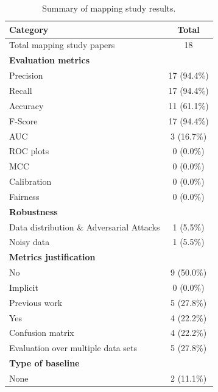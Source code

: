 \documentclass[a4paper]{article}
\begin{document}
\begin{table}[H]
	\caption{Summary of mapping study results.}
	\begin{tabularx}{\textwidth}{|X|c|}
		\hline
		\textbf{Category} & \textbf{Total} \\
		\hline
		Total mapping study papers & 18 \\
		\hline
		\textbf{Evaluation metrics} & \\
		\hspace{3mm} Precision & 17 (94.4\%)  \\
		\hspace{3mm} Recall & 17 (94.4\%) \\
		\hspace{3mm} Accuracy & 11 (61.1\%) \\
		\hspace{3mm} F-Score & 17 (94.4\%)\\
		\hspace{3mm} AUC & 3 (16.7\%) \\
		\hspace{3mm} ROC plots & 0 (0.0\%) \\
		\hspace{3mm} MCC & 0 (0.0\%) \\
		Calibration & 0 (0.0\%) \\
		Fairness &  0 (0.0\%) \\
		\textbf{Robustness} &  \\
		\hspace{3mm} Data distribution \& Adversarial Attacks & 1 (5.5\%)  \\
		\hspace{3mm} Noisy data & 1 (5.5\%) \\
		\textbf{Metrics justification} &\\
		\hspace{3mm} No & 9 (50.0\%) \\
		\hspace{3mm} Implicit & 0 (0.0\%) \\
		\hspace{3mm} Previous work & 5 (27.8\%) \\
		\hspace{3mm} Yes & 4 (22.2\%) \\
		Confusion matrix & 4 (22.2\%) \\
		Evaluation over multiple data sets & 5 (27.8\%) \\
		\textbf{Type of baseline} &\\
		\hspace{3mm} None & 2 (11.1\%) \\

\end{tabularx}
\end{table}
\end{document}
